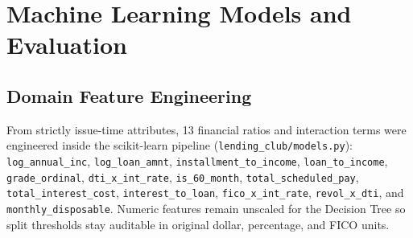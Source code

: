 \documentclass[conference]{IEEEtran}
\begin{document}
\section{Machine Learning Models and Evaluation}
\subsection{Domain Feature Engineering}
From strictly issue-time attributes, 13 financial ratios and interaction terms were engineered inside the scikit-learn pipeline (\texttt{lending\_club/models.py}): \texttt{log\_annual\_inc}, \texttt{log\_loan\_amnt}, \texttt{installment\_to\_income}, \texttt{loan\_to\_income}, \texttt{grade\_ordinal}, \texttt{dti\_x\_int\_rate}, \texttt{is\_60\_month}, \texttt{total\_scheduled\_pay}, \texttt{total\_interest\_cost}, \texttt{interest\_to\_loan}, \texttt{fico\_x\_int\_rate}, \texttt{revol\_x\_dti}, and \texttt{monthly\_disposable}. Numeric features remain unscaled for the Decision Tree so split thresholds stay auditable in original dollar, percentage, and FICO units.
\end{document}
